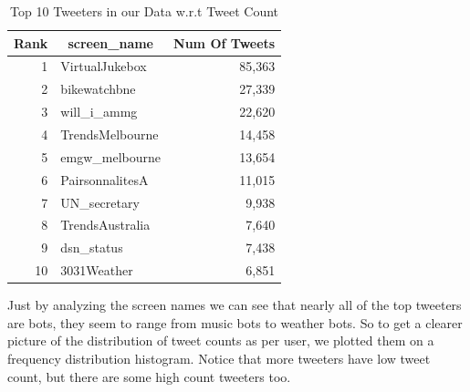 \documentclass[12pt]{report}
\theoremstyle{named}
\begin{document}
\begin{table}[ht]
\centering
\begin{tabular}{@{}rlr@{}}
\toprule
\multicolumn{1}{l}{\textbf{Rank}} & \multicolumn{1}{c}{\textbf{screen\_name}} & \multicolumn{1}{c}{\textbf{Num Of Tweets}} \\ \midrule
1                                 & VirtualJukebox                            & 85,363                                      \\
2                                 & bikewatchbne                              & 27,339                                      \\
3                                 & will\_i\_ammg                             & 22,620                                      \\
4                                 & TrendsMelbourne                              & 14,458                                      \\
5                                 & emgw\_melbourne                           & 13,654                                      \\
6                                 & PairsonnalitesA                           & 11,015                                      \\
7                                 & UN\_secretary                             & 9,938                                       \\
8                                 & TrendsAustralia                           & 7,640                                       \\
9                                 & dsn\_status                               & 7,438                                       \\
10                                & 3031Weather                               & 6,851                                       \\ \bottomrule
\end{tabular}
\caption{Top 10 Tweeters in our Data w.r.t Tweet Count}
\label{tab:TopTweeters}
\end{table}
Just by analyzing the screen names we can see that nearly all of the top tweeters are bots, they seem to range from music bots to weather bots. So to get a clearer picture of the distribution of tweet counts as per user, we plotted them on a frequency distribution histogram. Notice that more tweeters have low tweet count, but there are some high count tweeters too. 
\end{document}
